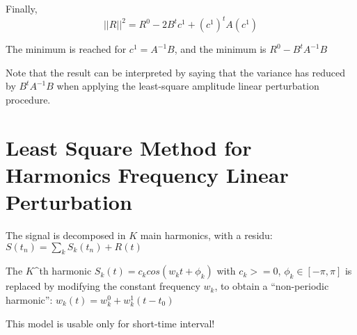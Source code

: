 \documentclass[english]{article}
\begin{document}
\noindent Finally,
\begin{equation}
||R||^2 = R^0 -2 B^t c^1 + (c^1)^t A (c^1)
\end{equation}

\noindent The minimum is reached for $c^1 = A^{-1} B$, and the minimum is $ R^0 - B^t A^{-1} B$

\noindent Note that the result can be interpreted by saying that the variance has reduced by $B^t A^{-1} B$ when
applying the least-square amplitude linear perturbation procedure.


\section{Least Square Method for Harmonics Frequency Linear Perturbation}

The signal is decomposed in $K$ main harmonics, with a residu:
$ S(t_n) = \sum_k S_k(t_n) + R(t)$

\noindent The $K$^{th} harmonic
$ S_{k}(t) = c_{k} cos(w_{k} t+\phi_{k})$  with $c_k >= 0$, $\phi_k \in [-\pi,\pi]$
is replaced by modifying the constant frequency $w_k$, to obtain a ``non-periodic harmonic'':
$ w_k(t) = w_k^0 + w_k^1 (t-t_0) $ 

\noindent This model is usable only for short-time interval!
\end{document}
